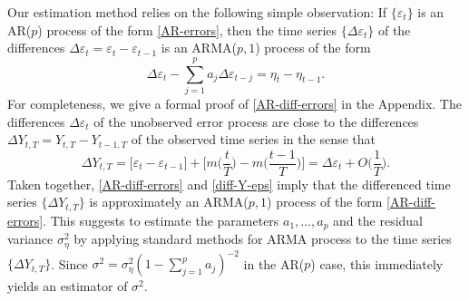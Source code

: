 Our estimation method relies on the following simple observation: If $\{\varepsilon_t\}$ is an AR($p$) process of the form \eqref{AR-errors}, then the time series $\{ \Delta \varepsilon_t \}$ of the differences $\Delta \varepsilon_t = \varepsilon_t - \varepsilon_{t-1}$ is an ARMA($p,1$) process of the form 
\begin{equation}\label{AR-diff-errors} 
\Delta \varepsilon_t - \sum_{j=1}^p a_j \Delta \varepsilon_{t-j} = \eta_t - \eta_{t-1}. 
\end{equation}
For completeness, we give a formal proof of \eqref{AR-diff-errors} in the Appendix. The differences $\Delta \varepsilon_t$ of the unobserved error process are close to the differences $\Delta Y_{t,T} = Y_{t,T} - Y_{t-1,T}$ of the observed time series in the sense that 
\begin{equation}\label{diff-Y-eps}
\Delta Y_{t,T} = \big[\varepsilon_t  - \varepsilon_{t-1} \big] + \Big[ m \Big(\frac{t}{T}\Big) - m \Big(\frac{t-1}{T}\Big) \Big] = \Delta \varepsilon_t + O \Big( \frac{1}{T} \Big).  
\end{equation} 
Taken together, \eqref{AR-diff-errors} and \eqref{diff-Y-eps} imply that the differenced time series $\{ \Delta Y_{t,T} \}$ is approximately an ARMA($p,1$) process of the form \eqref{AR-diff-errors}. This suggests to estimate the parameters $a_1,\ldots,a_p$ and the residual variance $\sigma_\eta^2$ by applying standard methods for ARMA process to the time series $\{ \Delta Y_{t,T} \}$. Since $\sigma^2 = \sigma^2_\eta ( 1-\sum_{j=1}^p a_j)^{-2}$ in the AR($p$) case, this immediately yields an estimator of $\sigma^2$. 


